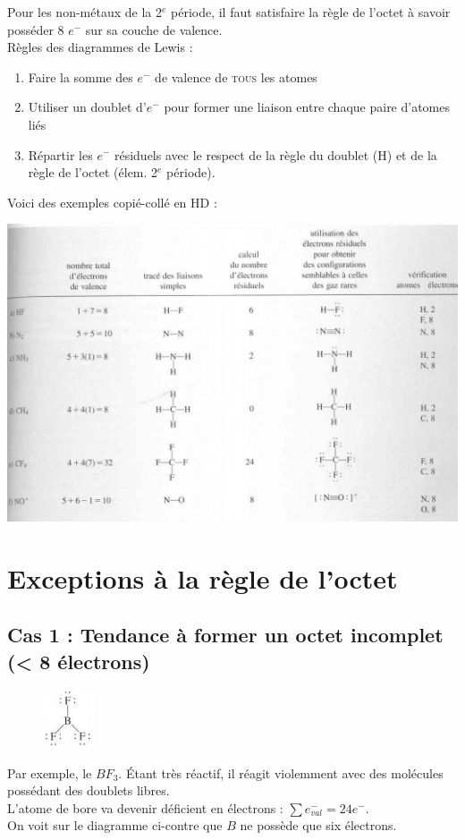 \documentclass[british,french,11pt, a4paper, openany]{book}
\begin{document}
Pour les non-métaux de la 2$^e$ période, il faut satisfaire la règle de l'octet à savoir posséder 8 $e^-$ sur sa couche de valence.\\
Règles des diagrammes de Lewis :
\begin{enumerate}
	\item Faire la somme des $e^-$ de valence de \textsc{tous} les atomes
	\item Utiliser un doublet d'$e^-$ pour former une liaison entre chaque paire d'atomes liés
	\item Répartir les $e^-$ résiduels avec le respect de la règle du doublet (H) et de la règle de l'octet (élem. 2$^e$ période).
\end{enumerate}
Voici des exemples copié-collé en HD : 
\begin{center}
	\includegraphics[scale=0.85]{image7.png}\\
\end{center}

\section{Exceptions à la règle de l'octet}
\subsection{Cas 1 :  Tendance à former un octet incomplet (< 8 électrons)}
\begin{figure}
	\includegraphics[width=1.5cm]{image8.png}
\end{figure}
Par exemple, le $BF_3$. Étant très réactif, il réagit violemment avec des molécules possédant des doublets libres.\\
L'atome de bore va devenir déficient en électrons : $\sum e^-_{val} = 24 e^-$.\\
On voit sur le diagramme ci-contre que $B$ ne possède que six électrons.
\end{document}
